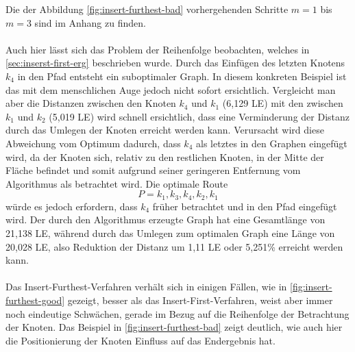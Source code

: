 Die der Abbildung \vref{fig:insert-furthest-bad} vorhergehenden Schritte $m=1$ bis $m=3$ sind im Anhang zu finden. 
\\\\
Auch hier lässt sich das Problem der Reihenfolge beobachten, welches in \vref{sec:inserst-first-erg} beschrieben wurde.
Durch das Einfügen des letzten Knotens $k_4$ in den Pfad entsteht ein suboptimaler Graph.
In diesem konkreten Beispiel ist das mit dem menschlichen Auge jedoch nicht sofort ersichtlich.
Vergleicht man aber die Distanzen zwischen den Knoten $k_4$ und $k_1$ (6,129 \ac{LE}) mit den zwischen $k_1$ und $k_2$ (5,019 \ac{LE}) wird schnell ersichtlich, dass eine Verminderung der Distanz durch das Umlegen der Knoten erreicht werden kann.
Verursacht wird diese Abweichung vom Optimum dadurch, dass $k_4$ als letztes in den Graphen eingefügt wird, da der Knoten sich, relativ zu den restlichen Knoten, in der Mitte der Fläche befindet und somit aufgrund seiner geringeren Entfernung vom Algorithmus als betrachtet wird.
Die optimale Route
$$P = k_1, k_3, k_4, k_2, k_1$$ 
 würde es jedoch erfordern, dass $k_4$ früher betrachtet und in den Pfad eingefügt wird.
Der durch den Algorithmus erzeugte Graph hat eine Gesamtlänge von 21,138 \ac{LE}, während durch das Umlegen zum optimalen Graph eine Länge von 20,028 \ac{LE}, also Reduktion der Distanz um 1,11 \ac{LE} oder 5,251\% erreicht werden kann.
\\\\
Das Insert-Furthest-Verfahren verhält sich in einigen Fällen, wie in \vref{fig:insert-furthest-good} gezeigt, besser als das Insert-First-Verfahren, weist aber immer noch eindeutige Schwächen, gerade im Bezug auf die Reihenfolge der Betrachtung der Knoten.
Das Beispiel in \vref{fig:insert-furthest-bad} zeigt deutlich, wie auch hier die Positionierung der Knoten Einfluss auf das Endergebnis hat.